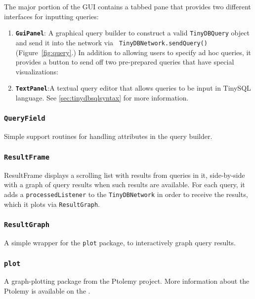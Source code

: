 \documentclass[11pt]{article}
\begin{document}
The major portion of the GUI contains a tabbed pane that provides
two different interfaces for inputting queries:

\begin{enumerate}
\item{\bf {\tt GuiPanel}}: A graphical query builder to construct a valid
{\tt TinyDBQuery} object and send it into the network via {\tt
TinyDBNetwork.sendQuery()} (Figure~\ref{fig:query}.)  In addition to
allowing users to specify ad hoc queries, it provides a button to
send off two pre-prepared queries that have special visualizations:
\item{\bf {\tt TextPanel}}:A textual query editor that allows queries to be input
in TinySQL language.  See \ref{sec:tinydbsqlsyntax} for more information.
\end{enumerate}
  
\subsubsection{\tt QueryField}
\label{sec:queryfield}
Simple support routines for handling
attributes in the query builder.

\subsubsection{\tt ResultFrame}
\label{sec:resultframe}
ResultFrame displays a scrolling list with
    results from queries in it, side-by-side with a graph of query
    results when such results are available.  For each query, it adds
    a {\tt processedListener} to the {\tt TinyDBNetwork} in order to
    receive the results, which it plots via {\tt ResultGraph}.

\subsubsection{\tt ResultGraph} 
\label{sec:resultgraph}
A simple wrapper for the {\tt plot} package, to
  interactively graph query results.

\subsubsection{\tt plot}
\label{sec:plot}
A graph-plotting package from the Ptolemy project.  More information about the Ptolemy is available on the .
\end{document}
